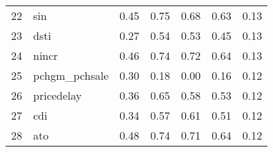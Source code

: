 \documentclass[12pt]{article}
\begin{document}
\begin{footnotesize}
\begin{longtable}{rl|c|c|c|c|c}
22  & sin              & 0.45                                                                                      & 0.75                                                                                        & 0.68                                                                                         & 0.63 & 0.13               \\
23  & dsti             & 0.27                                                                                      & 0.54                                                                                        & 0.53                                                                                         & 0.45 & 0.13               \\
24  & nincr            & 0.46                                                                                      & 0.74                                                                                        & 0.72                                                                                         & 0.64 & 0.13               \\
25  & pchgm\_pchsale   & 0.30                                                                                      & 0.18                                                                                        & 0.00                                                                                         & 0.16 & 0.12               \\
26  & pricedelay       & 0.36                                                                                      & 0.65                                                                                        & 0.58                                                                                         & 0.53 & 0.12               \\
27  & cdi              & 0.34                                                                                      & 0.57                                                                                        & 0.61                                                                                         & 0.51 & 0.12               \\
28  & ato              & 0.48                                                                                      & 0.74                                                                                        & 0.71                                                                                         & 0.64 & 0.12               \\

\end{longtable}
\end{footnotesize}
\end{document}
